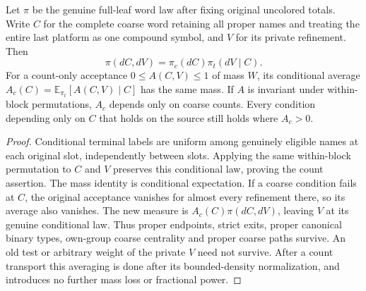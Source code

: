 \begin{lemma}\label{paper:ep-terminal-marginal}
Let $\pi$ be the genuine full-leaf word law after fixing original
uncolored totals.  Write $C$ for the complete coarse word retaining
all proper names and treating the entire last platform as one compound
symbol, and $V$ for its private refinement.  Then
\[
 \pi(dC,dV)=\pi_c(dC)\pi_t(dV\mid C).
\]
For a count-only acceptance $0\leq A(C,V)\leq1$ of mass $W$, its
conditional average $A_c(C)=\mathbb E_{\pi_t}[A(C,V)\mid C]$ has
the same mass.  If $A$ is invariant under within-block permutations,
$A_c$ depends only on coarse counts.  Every condition depending only
on $C$ that holds on the source still holds where $A_c>0$.
\end{lemma}
\begin{proof}
Conditional terminal labels are uniform among genuinely eligible names
at each original slot, independently between slots.  Applying the
same within-block permutation to $C$ and $V$ preserves this conditional
law, proving the count assertion.  The mass identity is conditional
expectation.  If a coarse condition fails at $C$, the original
acceptance vanishes for almost every refinement there, so its average
also vanishes.  The new measure is $A_c(C)\pi(dC,dV)$, leaving $V$
at its genuine conditional law.  Thus proper endpoints, strict exits,
proper canonical binary types, own-group coarse centrality and proper
coarse paths survive.  An old test or arbitrary weight of the private
$V$ need not survive.  After a count transport this averaging is done
after its bounded-density normalization, and introduces no further
mass loss or fractional power.
\end{proof}


